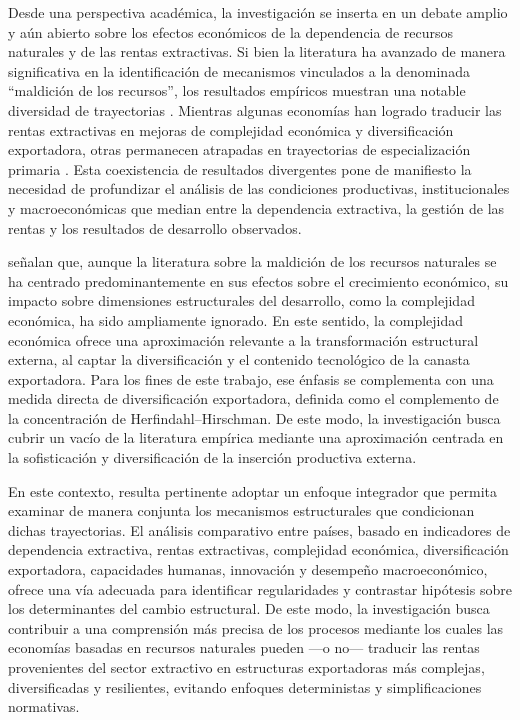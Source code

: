 \documentclass[../../PTFM.tex]{subfiles}
\begin{document}
	Desde una perspectiva académica, la investigación se inserta en un debate amplio y aún abierto sobre los efectos económicos de la dependencia de recursos naturales y de las rentas extractivas. Si bien la literatura ha avanzado de manera significativa en la identificación de mecanismos vinculados a la denominada ``maldición de los recursos'', los resultados empíricos muestran una notable diversidad de trayectorias \parencite{Brunnschweiler2006,Brunnschweiler2008,Lebdioui2019}. Mientras algunas economías han logrado traducir las rentas extractivas en mejoras de complejidad económica y diversificación exportadora, otras permanecen atrapadas en trayectorias de especialización primaria \parencite{Lebdioui2019,Ville2013}. Esta coexistencia de resultados divergentes pone de manifiesto la necesidad de profundizar el análisis de las condiciones productivas, institucionales y macroeconómicas que median entre la dependencia extractiva, la gestión de las rentas y los resultados de desarrollo observados.

	\textcite{Ajide2022} señalan que, aunque la literatura sobre la maldición de los recursos naturales se ha centrado predominantemente en sus efectos sobre el crecimiento económico, su impacto sobre dimensiones estructurales del desarrollo, como la complejidad económica, ha sido ampliamente ignorado. En este sentido, la complejidad económica ofrece una aproximación relevante a la transformación estructural externa, al captar la diversificación y el contenido tecnológico de la canasta exportadora. Para los fines de este trabajo, ese énfasis se complementa con una medida directa de diversificación exportadora, definida como el complemento de la concentración de Herfindahl--Hirschman. De este modo, la investigación busca cubrir un vacío de la literatura empírica mediante una aproximación centrada en la sofisticación y diversificación de la inserción productiva externa.

	En este contexto, resulta pertinente adoptar un enfoque integrador que permita examinar de manera conjunta los mecanismos estructurales que condicionan dichas trayectorias. El análisis comparativo entre países, basado en indicadores de dependencia extractiva, rentas extractivas, complejidad económica, diversificación exportadora, capacidades humanas, innovación y desempeño macroeconómico, ofrece una vía adecuada para identificar regularidades y contrastar hipótesis sobre los determinantes del cambio estructural. De este modo, la investigación busca contribuir a una comprensión más precisa de los procesos mediante los cuales las economías basadas en recursos naturales pueden ---o no--- traducir las rentas provenientes del sector extractivo en estructuras exportadoras más complejas, diversificadas y resilientes, evitando enfoques deterministas y simplificaciones normativas.
\end{document}
